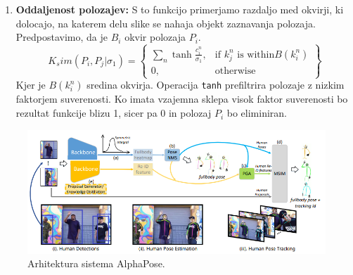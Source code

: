 \documentclass[a4paper,twoside,openright,12pt,slovene]{book}
\begin{document}
\begin{itemize}
\begin{enumerate}
                \item \textbf{Oddaljenost polozajev:} S to funkcijo primerjamo razdaljo med okvirji, ki dolocajo, na katerem delu slike se nahaja objekt zaznavanja polozaja. Predpostavimo, da je $B_i$ okvir polozaja $P_i$.
                \begin{equation}
                K_sim(P_i, P_j | \sigma_1) = 
                \left\{
                    \begin{array}{lr}
                        \sum_n \tanh\frac{c_i^n}{\sigma_1}, & \text{if } k_j^n\text{ is within} B(k_i^n) \\
                        
                        0, & \text{otherwise}
                    \end{array}
                \right\} 
                \end{equation}
                Kjer je $B(k_i^n)$ sredina okvirja. Operacija \verb|tanh| prefiltrira polozaje z nizkim faktorjem suverenosti. Ko imata vzajemna sklepa visok faktor suverenosti bo rezultat funkcije blizu 1, sicer pa 0 in polozaj $P_i$ bo eliminiran\cite{AlphaPose_clanek}.
            \end{enumerate}

\begin{figure}[h]
    \centering
    \includegraphics[width=1\columnwidth]{Slike/apfc.png}
    \caption{\label{alphapose_arhitektura} Arhitektura sistema AlphaPose.}
\end{figure}
        
    \end{itemize}
\end{document}
